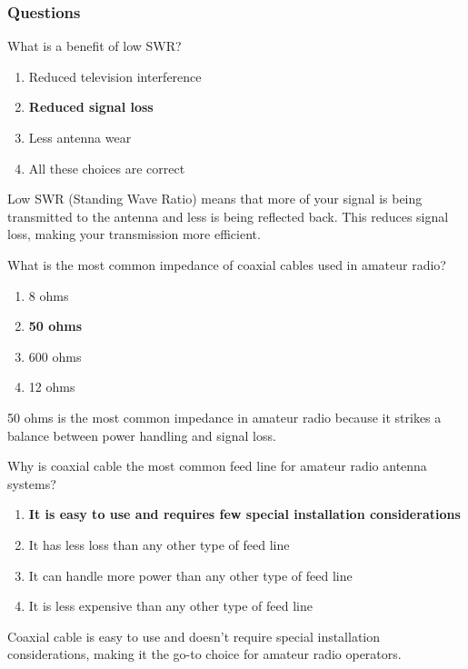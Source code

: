 \subsubsection*{Questions}

\begin{tcolorbox}[colback=gray!10!white,colframe=black!75!black,title={T9B01}]
What is a benefit of low SWR?
\begin{enumerate}[label=\Alph*),noitemsep]
    \item Reduced television interference
    \item \textbf{Reduced signal loss}
    \item Less antenna wear
    \item All these choices are correct
\end{enumerate}
\end{tcolorbox}
Low SWR (Standing Wave Ratio) means that more of your signal is being transmitted to the antenna and less is being reflected back. This reduces signal loss, making your transmission more efficient.

\begin{tcolorbox}[colback=gray!10!white,colframe=black!75!black,title={T9B02}]
What is the most common impedance of coaxial cables used in amateur radio?
\begin{enumerate}[label=\Alph*),noitemsep]
    \item 8 ohms
    \item \textbf{50 ohms}
    \item 600 ohms
    \item 12 ohms
\end{enumerate}
\end{tcolorbox}
50 ohms is the most common impedance in amateur radio because it strikes a balance between power handling and signal loss.

\begin{tcolorbox}[colback=gray!10!white,colframe=black!75!black,title={T9B03}]
Why is coaxial cable the most common feed line for amateur radio antenna systems?
\begin{enumerate}[label=\Alph*),noitemsep]
    \item \textbf{It is easy to use and requires few special installation considerations}
    \item It has less loss than any other type of feed line
    \item It can handle more power than any other type of feed line
    \item It is less expensive than any other type of feed line
\end{enumerate}
\end{tcolorbox}
Coaxial cable is easy to use and doesn't require special installation considerations, making it the go-to choice for amateur radio operators.

